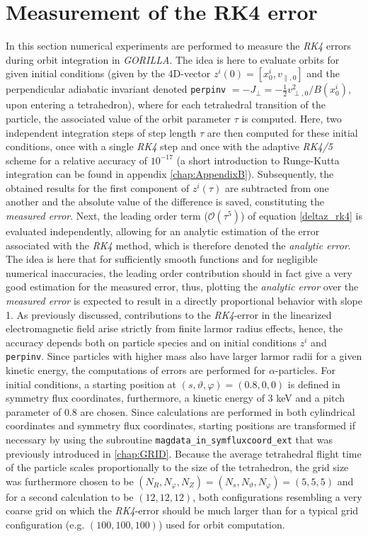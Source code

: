 \documentclass[./main.tex]{subfiles}
\begin{document}
\section{Measurement of the RK4 error}
In this section numerical experiments are performed to measure the \textit{RK4} errors during orbit integration in \textit{GORILLA}. The idea is here to evaluate orbits for given initial conditions (given by the 4D-vector $z^i(0)=[x^i_0,v_{\parallel,0}]$ and the perpendicular adiabatic invariant denoted \texttt{perpinv} $=-J_\perp=-\frac{1}{2} v_{\perp,0}^2/B(x^i_0)$, upon entering a tetrahedron), where for each tetrahedral transition of the particle, the associated value of the orbit parameter $\tau$ is computed. Here, two  independent integration steps of step length $\tau$ are then computed for these initial conditions, once with a single \textit{RK4} step and once with the adaptive \textit{RK4/5} scheme for a relative accuracy of $10^{-17}$ (a short introduction to Runge-Kutta integration can be found in appendix \ref{chap:AppendixB}). Subsequently, the obtained results for the first component of $z^i(\tau)$ are subtracted from one another and the absolute value of the difference is saved, constituting the \textit{measured error}. Next, the leading order term ($\mathcal{O}(\tau^5)$) of equation \eqref{deltaz_rk4} is evaluated independently, allowing for an analytic estimation of the error associated with the \textit{RK4} method, which is therefore denoted the \textit{analytic error}. The idea is here that for sufficiently smooth functions and for negligible numerical inaccuracies, the leading order contribution should in fact give a very good estimation for the measured error, thus, plotting the \textit{analytic error} over the \textit{measured error} is expected to result in a directly proportional behavior with slope 1.
As previously discussed, contributions to the \textit{RK4}-error in the linearized electromagnetic field arise strictly from finite larmor radius effects, hence, the accuracy depends both on particle species and on initial conditions $z^i$ and \texttt{perpinv}. Since particles with higher mass also have larger larmor radii for a given kinetic energy, the computations of  errors are performed for $\alpha$-particles. For initial conditions, a starting position at $(s,\vartheta,\varphi) = (0.8,0,0)$ is defined in symmetry flux coordinates, furthermore, a kinetic energy of 3 \textrm{keV} and a pitch parameter of 0.8 are chosen. Since calculations are performed in both cylindrical coordinates and symmetry flux coordinates, starting positions are transformed if necessary by using the subroutine \texttt{magdata\_in\_symfluxcoord\_ext} that was previously introduced in \autoref{chap:GRID}. Because the average tetrahedral flight time of the particle scales proportionally to the size of the tetrahedron, the grid size was furthermore chosen to be $(N_R,N_\varphi,N_Z) = (N_s,N_\vartheta,N_\varphi)=(5,5,5)$ and for a second calculation to be $(12,12,12)$, both configurations resembling a very coarse grid on which the \textit{RK4}-error should be much larger than for a typical grid configuration (e.g. $(100,100,100)$) used for orbit computation.
\end{document}
